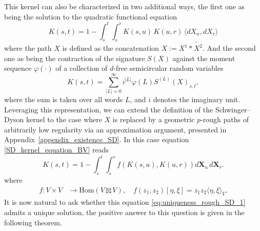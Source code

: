 \documentclass{article}%
\begin{document}
This kernel can also be characterized in two additional ways, the first one as being the solution to the quadratic functional equation
\begin{equation}\label{SD_kernel_equation_BV}
K(s,t) = 1 - \int_s^t \int_s^r K(s,u)\, K(u,r)\, \langle dX_u, dX_r \rangle 
\end{equation}
where the path $X$ is defined as the concatenation $X := X^1 * \overleftarrow{X^2}$.\newline
And the second one as being the contraction of the signature $S(X)$ against the moment sequence $\varphi(\cdot)$ of a collection of $d$-free semicircular random variables
\begin{equation}\label{expansion_K}
K(s,t) = \sum_{|L| = 0}^\infty i^{|L|} \varphi(L) S^{(L)}(X)_{s,t},
\end{equation}
where the sum is taken over all words $L$, and $i$ denotes the imaginary unit.\newline
Leveraging this representation, we can extend the definition of the Schwinger--Dyson kernel to the case where $X$ is replaced by a  geometric $p$-rough paths of arbitrarily low regularity via an approximation argument, presented in Appendix~\ref{appendix_existence_SD}. In this case equation \eqref{SD_kernel_equation_BV} reads
\begin{equation}\label{eq:uniqueness_rough_SD_1}
    K(s,t) = 1 -  \int_s^t \int_s^r f(K(s,u), K(u,r)) d\mathbf{X}_u\,d\mathbf{X}_r.
\end{equation}
where 
\begin{align*}    
f: V \times V &\to \mathrm{Hom}(V \boxtimes V), \quad f(z_1, z_2)  [\eta, \xi] = z_1 z_2 \langle \eta, \xi \rangle_V .
\end{align*}
It is now natural to ask whether this equation \eqref{eq:uniqueness_rough_SD_1}
admits a unique solution, the positive answer to this question is given in the following theorem.
\end{document}
